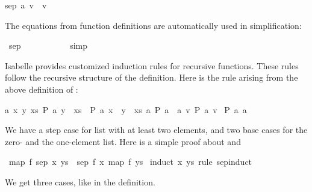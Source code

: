 \begin{isabellebody}
\begin{isamarkuptext}
\begin{isabelle}
sep\ a\ {\isacharbrackleft}v{\isacharbrackright}\ {\isacharequal}\ {\isacharbrackleft}v{\isacharbrackright}%
\end{isabelle}%
\end{isamarkuptext}%
\isamarkuptrue%
%
\begin{isamarkuptext}%
\noindent The equations from function definitions are automatically used in
  simplification:%
\end{isamarkuptext}%
\isamarkuptrue%
\isamarkupfalse%
\ {\isachardoublequoteopen}sep\ {}\ {\isacharbrackleft}{}{\isacharcomma}\ {}{\isacharcomma}\ {}{\isacharbrackright}\ {\isacharequal}\ {\isacharbrackleft}{}{\isacharcomma}\ {}{\isacharcomma}\ {}{\isacharcomma}\ {}{\isacharcomma}\ {}{\isacharbrackright}{\isachardoublequoteclose}\isanewline
%
\isadelimproof
%
\endisadelimproof
%
\isatagproof
{}\isamarkupfalse%
\ simp%
\endisatagproof
{\isafoldproof}%
%
\isadelimproof
%
\endisadelimproof
%
\isamarkuptrue%
%
\begin{isamarkuptext}%
Isabelle provides customized induction rules for recursive
  functions. These rules follow the recursive structure of the
  definition. Here is the rule  arising from the
  above definition of :

  \begin{isabelle}%
{\isasymlbrakk}{\isasymAnd}a\ x\ y\ xs{\isachardot}\ {\isacharquery}P\ a\ {\isacharparenleft}y\ {\isacharhash}\ xs{\isacharparenright}\ {\isasymLongrightarrow}\ {\isacharquery}P\ a\ {\isacharparenleft}x\ {\isacharhash}\ y\ {\isacharhash}\ xs{\isacharparenright}{\isacharsemicolon}\ {\isasymAnd}a{\isachardot}\ {\isacharquery}P\ a\ {\isacharbrackleft}{\isacharbrackright}{\isacharsemicolon}\ {\isasymAnd}a\ v{\isachardot}\ {\isacharquery}P\ a\ {\isacharbrackleft}v{\isacharbrackright}{\isasymrbrakk}\isanewline
{\isasymLongrightarrow}\ {\isacharquery}P\ {\isacharquery}a{}{\isachardot}{}\ {\isacharquery}a{}{\isachardot}{}%
\end{isabelle}
  
  We have a step case for list with at least two elements, and two
  base cases for the zero- and the one-element list. Here is a simple
  proof about  and %
\end{isamarkuptext}%
\isamarkuptrue%
\isamarkupfalse%
\ {\isachardoublequoteopen}map\ f\ {\isacharparenleft}sep\ x\ ys{\isacharparenright}\ {\isacharequal}\ sep\ {\isacharparenleft}f\ x{\isacharparenright}\ {\isacharparenleft}map\ f\ ys{\isacharparenright}{\isachardoublequoteclose}\isanewline
%
\isadelimproof
%
\endisadelimproof
%
\isatagproof
{}\isamarkupfalse%
\ {\isacharparenleft}induct\ x\ ys\ rule{\isacharcolon}\ sep{\isachardot}induct{\isacharparenright}%
\begin{isamarkuptxt}%
We get three cases, like in the definition.


\end{isamarkuptxt}
\end{isabellebody}
